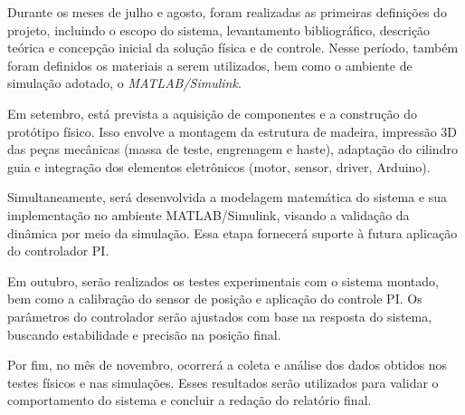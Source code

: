 \documentclass[9pt,a4paper,twocolumn,twoside]{tau-class/tau}
\begin{document}
    Durante os meses de julho e agosto, foram realizadas as primeiras definições do projeto, incluindo o escopo do sistema, levantamento bibliográfico, descrição teórica e concepção inicial da solução física e de controle. Nesse período, também foram definidos os materiais a serem utilizados, bem como o ambiente de simulação adotado, o \textit{MATLAB/Simulink}.

    Em setembro, está prevista a aquisição de componentes e a construção do protótipo físico. Isso envolve a montagem da estrutura de madeira, impressão 3D das peças mecânicas (massa de teste, engrenagem e haste), adaptação do cilindro guia e integração dos elementos eletrônicos (motor, sensor, driver, Arduino).

    Simultaneamente, será desenvolvida a modelagem matemática do sistema e sua implementação no ambiente MATLAB/Simulink, visando a validação da dinâmica por meio da simulação. Essa etapa fornecerá suporte à futura aplicação do controlador PI.

    Em outubro, serão realizados os testes experimentais com o sistema montado, bem como a calibração do sensor de posição e aplicação do controle PI. Os parâmetros do controlador serão ajustados com base na resposta do sistema, buscando estabilidade e precisão na posição final.

    Por fim, no mês de novembro, ocorrerá a coleta e análise dos dados obtidos nos testes físicos e nas simulações. Esses resultados serão utilizados para validar o comportamento do sistema e concluir a redação do relatório final.


\printbibliography

\end{document}
